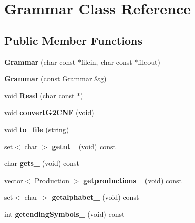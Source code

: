 \hypertarget{class_grammar}{}\section{Grammar Class Reference}
\label{class_grammar}
\subsection*{Public Member Functions}
\begin{DoxyCompactItemize}
\item 
\mbox{\label{class_grammar_a36892ec7e2a01b64929d4d4b8e0caac3}} 
{\bfseries Grammar} (char const $\ast$filein, char const $\ast$fileout)
\item 
\mbox{\label{class_grammar_a8a4f2f3202d7dda61ce56057907a8d53}} 
{\bfseries Grammar} (const \hyperlink{class_grammar}{Grammar} \&g)
\item 
\mbox{\label{class_grammar_a83b5981c6e5075ae70db14bbe584de3b}} 
void {\bfseries Read} (char const $\ast$)
\item 
\mbox{\label{class_grammar_ab322778cfcc5030ec93b75e94b085dbc}} 
void {\bfseries convert\+G2\+C\+NF} (void)
\item 
\mbox{\label{class_grammar_a02add08e9944e01c77d002e585ac1f0d}} 
void {\bfseries to\+\_\+file} (string)
\item 
\mbox{\label{class_grammar_ae5e4ba01c0c264aca88443ed49d57ad1}} 
set$<$ char $>$ {\bfseries getnt\+\_\+} (void) const
\item 
\mbox{\label{class_grammar_af52305c1815f71e4720adbf50174d53e}} 
char {\bfseries gets\+\_\+} (void) const
\item 
\mbox{\label{class_grammar_a0ab76944129c872e2d69f0b749d8942c}} 
vector$<$ \hyperlink{class_production}{Production} $>$ {\bfseries getproductions\+\_\+} (void) const
\item 
\mbox{\label{class_grammar_a5f6e21f0de2f36c9d9609ea2c881dbf7}} 
set$<$ char $>$ {\bfseries getalphabet\+\_\+} (void) const
\item 
\mbox{\label{class_grammar_a4ea8f325aff532f6b8a1dd1247e6fc84}} 
int {\bfseries getending\+Symbols\+\_\+} (void) const
\end{DoxyCompactItemize}
